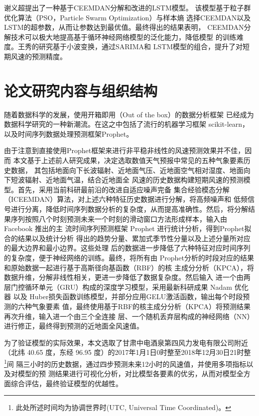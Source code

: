 \documentclass[AutoFakeBold]{LZUThesis}
\begin{document}
谢义超提出了一种基于CEEMDAN分解和改进的LSTM模型。
该模型基于粒子群优化算法（PSO，Particle Swarm Optimization）与样本熵
选择CEEMDAN以及LSTM的超参数，从而让参数达到最优值。最终得出的结果表明，
CEEMDAN分解技术可以极大地提高基于循环神经网络模型的泛化能力，降低模型
的训练难度。王秀的研究基于小波变换，通过SARIMA和
LSTM模型的组合，提升了对短期风速的预测精度。

\section{论文研究内容与组织结构}

随着数据科学的发展，使用开箱即用（Out of the box）的数据分析框架
已经成为数据科学研究的一种新潮流。在这之中包括了流行的机器学习框架
scikit-learn，以及时间序列数据处理预测框架Prophet。

由于注意到直接使用Prophet框架来进行非平稳非线性的风速预测效果并不佳，因而
本文基于上述前人研究成果，决定选取数值天气预报中常见的五种气象要素历史数据，
其包括地面向下长波辐射、近地面气压、近地面空气相对湿度、地面向下短波辐射、近地面气温，结合近地面全
风速的历史数据构建短期风速的预测模型。首先，采用当前科研最前沿的改进自适应噪声完备
集合经验模态分解（ICEEMDAN）算法，对上述六种特征历史数据进行分解，将高频噪声和
低频信号进行分离，降低时间序列数据分析的复杂度，从而提高准确性。然后，将分解结
果序列按照八个时刻预测未来一个时刻的滑动窗口方法形成样本，输入由 Facebook 推出的主
流时间序列预测框架 Prophet 进行统计分析，得到Prophet拟合的结果以及统计分析
得出的趋势分量、累加式季节性分量以及上述分量所对应的最大边界和最小边界。这些处理
后的数据进一步降低了六种特征对应时间序列的复杂度，便于神经网络的训练。最终，将所有由
Prophet分析的时段对应的结果和原始数据一起进行基于高斯径向基函数（RBF）的核
主成分分析（KPCA），将数据升维，分解非线性相关，更进一步降低了数据复杂度。然后输入
进一个由两层门控循环单元（GRU）构成的深度学习模型，采用最新科研成果 Nadam 优化器
以及 Huber损失函数训练模型，并部分应用GELU激活函数，输出每个时段预测的六种气象要素
值，最终使用基于RBF的核主成分分析（KPCA）将预测结果再次升维，输入进一个由三个全连接
层、一个随机丢弃层构成的神经网络（NN）进行修正，最终得到预测的近地面全风速值。

为了验证模型的实际效果，本文选取了甘肃中电酒泉第四风力发电有限公司附近（北纬
40.65 度，东经 96.95 度）的2017年1月1日0时整至2018年12月30日21时整
\footnote{此处所述时间均为协调世界时(UTC, Universal Time Coordinated)。}间
隔三小时的历史数据，通过四步预测未来12小时的风速值，并使用多项指标以及对模型的预
测结果进行可视化分析，对比模型各要素的优劣，从而对模型全方面综合评估，最终验证模型的优越性。
\end{document}
